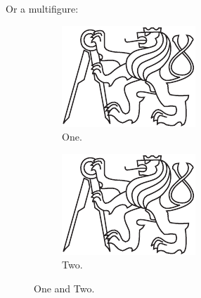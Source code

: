 Or a multifigure:
\begin{figure}[H]
\begin{center}
	\begin{subfigure}[b]{0.45\textwidth}
		\includegraphics[width=\textwidth]{./figures/fig.pdf}
		\caption{One.}
		\label{fig:one}
	\end{subfigure}
	\begin{subfigure}[b]{0.45\textwidth}
		\includegraphics[width=\textwidth]{./figures/fig.pdf}
		\caption{Two.}
		\label{fig:two}
	\end{subfigure}
	\caption{One and Two.}
	\label{fig:onetwo}
\end{center}
\end{figure}


